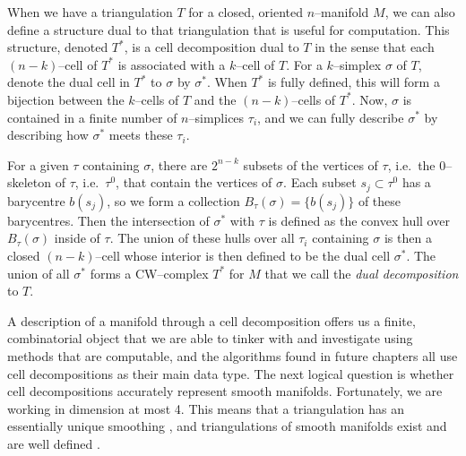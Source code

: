 \begin{defn}
  When we have a triangulation $T$ for a closed, oriented $n$--manifold $M$, we can also define a structure dual to that triangulation that is useful for computation.
  This structure, denoted $T^*$, is a cell decomposition dual to $T$ in the sense that each $(n-k)$--cell of $T^*$ is associated with a $k$--cell of $T$.
  For a $k$--simplex $\sigma$ of $T$, denote the dual cell in $T^*$ to $\sigma$ by $\sigma^*$.
  When $T^*$ is fully defined, this will form a bijection between the $k$--cells of $T$ and the $(n-k)$--cells of $T^*$.
  Now, $\sigma$ is contained in a finite number of $n$--simplices $\tau_i$, and we can fully describe $\sigma^*$ by describing how $\sigma^*$ meets these $\tau_i$.

  For a given $\tau$ containing $\sigma$, there are $2^{n-k}$ subsets of the vertices of $\tau$, i.e.\ the 0--skeleton of $\tau$, i.e.\ $\tau^0$, that contain the vertices of $\sigma$.
  Each subset $s_j\subset\tau^0$ has a barycentre $b(s_j)$, so we form a collection $B_\tau(\sigma)=\{b(s_j)\}$ of these barycentres.
  Then the intersection of $\sigma^*$ with $\tau$ is defined as the convex hull over $B_\tau(\sigma)$ inside of $\tau$.
  The union of these hulls over all $\tau_i$ containing $\sigma$ is then a closed $(n-k)$--cell whose interior is then defined to be the dual cell $\sigma^*$.
  The union of all $\sigma^*$ forms a CW--complex $T^*$ for $M$ that we call the \emph{dual decomposition} to $T$.
\end{defn}

A description of a manifold through a cell decomposition offers us a finite, combinatorial object that we are able to tinker with and investigate using methods that are computable, and the algorithms found in future chapters all use cell decompositions as their main data type.
The next logical question is whether cell decompositions accurately represent smooth manifolds.
Fortunately, we are working in dimension at most 4.
This means that a triangulation has an essentially unique smoothing \cite{HirsMazu}, and triangulations of smooth manifolds exist and are well defined \cite{Whit40}.
